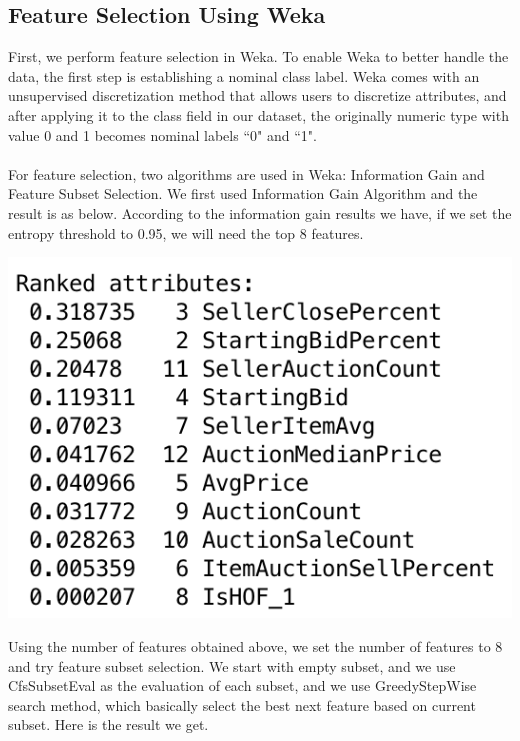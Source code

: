 \documentclass[CEJM,PDF]{cej} %
\begin{document}
\subsection{Feature Selection Using Weka}
First, we perform feature selection in Weka. To enable Weka to better handle the data, the first step is establishing a nominal class label. Weka comes with an unsupervised discretization method that allows users to discretize attributes, and after applying it to the class field in our dataset, the originally numeric type with value 0 and 1 becomes nominal labels ``0" and ``1".\\
\\
For feature selection, two algorithms are used in Weka: Information Gain and Feature Subset Selection. We first used Information Gain Algorithm and the result is as below. According to the information gain results we have, if we set the entropy threshold to 0.95, we will need the top 8 features.

{\centering
    \vspace{3 mm}
    \includegraphics[scale=0.6]{weka-InfoGain.png}
    \par
}

Using the number of features obtained above, we set the number of features to 8 and try feature subset selection. We start with empty subset, and we use CfsSubsetEval as the evaluation of each subset, and we use GreedyStepWise search method, which basically select the best next feature based on current subset. Here is the result we get.
\end{document}
